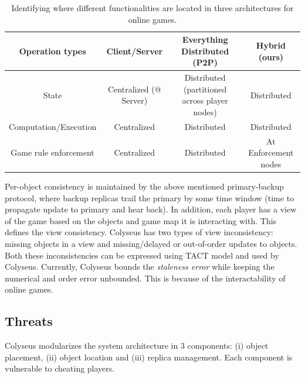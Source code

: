 \documentclass[twocolumn,10pt]{article}
\begin{document}
{%
\begin{table}
\centering
\begin{tabular}{|c|c|c|c|}
\hline
Operation types & Client/Server & Everything Distributed (P2P) & Hybrid (ours) \\
\hline
\hline
State & Centralized (@ Server) & Distributed (partitioned across player nodes) & Distributed  \\
\hline
Computation/Execution & Centralized & Distributed & Distributed\\
\hline
Game rule enforcement & Centralized & Distributed & At Enforcement nodes \\
\hline
\hline
\end{tabular}
\caption{Identifying where different functionalities are located in three architectures for online games.}
\label{tab:compare_arch}
\end{table}

Per-object consistency is maintained by the above mentioned primary-backup protocol, where backup
replicas trail the primary by some time window (time to propagate update to primary
and hear back). In addition, each player has a view of the game based on the objects and game
map it is interacting with. This defines the view consistency. Colyseus has two types of view
inconsistency: missing objects in a view and missing/delayed or out-of-order updates to objects. 
Both these inconsistencies can be expressed using TACT model and used by Colyseus. Currently,
Colyseus bounds the \emph{staleness error} while keeping the numerical and order error unbounded.
This is because of the interactability of online games. 

\subsection{Threats}
Colyseus modularizes the system architecture in 3 components: (i) object placement, (ii)
object location and (iii) replica management. Each component is vulnerable to cheating 
players. 

}
\end{document}
